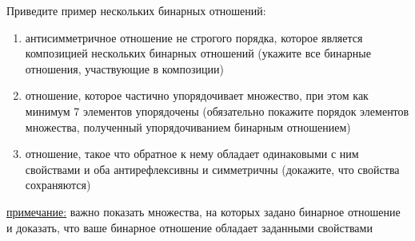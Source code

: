 \question
Приведите  пример  нескольких бинарных отношений:
\begin{enumerate}
	\renewcommand{\labelenumi}{\alph{enumi})}
	\item антисимметричное отношение не строгого порядка, которое является композицией нескольких бинарных отношений (укажите все бинарные отношения, участвующие в композиции)
	\item отношение, которое частично упорядочивает множество, при этом как минимум 7 элементов упорядочены (обязательно покажите порядок элементов множества, полученный упорядочиванием бинарным отношением)
	\item отношение, такое что обратное к нему обладает одинаковыми с ним свойствами и оба антирефлексивны и симметричны (докажите, что свойства сохраняются)
\end{enumerate}

\underline{примечание:} важно показать  множества, на которых задано бинарное отношение и доказать, что ваше бинарное отношение обладает заданными свойствами
